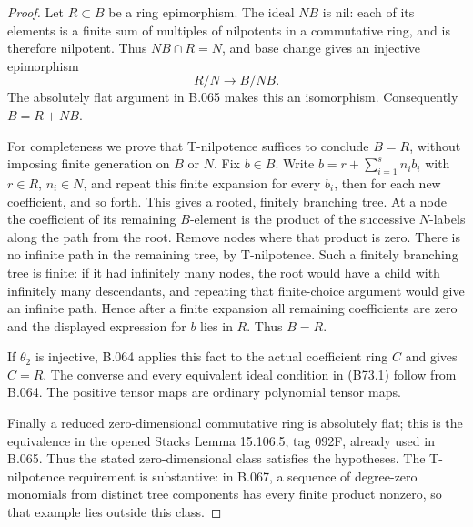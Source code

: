 \begin{proof}
Let $R\subset B$ be a ring epimorphism. The ideal $NB$ is nil: each of
its elements is a finite sum of multiples of nilpotents in a commutative
ring, and is therefore nilpotent. Thus $NB\cap R=N$, and base change
gives an injective epimorphism
\[
                         R/N\longrightarrow B/NB.
\]
The absolutely flat argument in B.065 makes this an isomorphism.
Consequently $B=R+NB$.

For completeness we prove that T-nilpotence suffices to conclude
$B=R$, without imposing finite generation on $B$ or $N$. Fix $b\in B$.
Write $b=r+\sum_{i=1}^s n_i b_i$ with $r\in R$, $n_i\in N$, and repeat
this finite expansion for every $b_i$, then for each new coefficient,
and so forth. This gives a rooted, finitely branching tree. At a node
the coefficient of its remaining $B$-element is the product of the
successive $N$-labels along the path from the root. Remove nodes where
that product is zero. There is no infinite path in the remaining tree,
by T-nilpotence. Such a finitely branching tree is finite: if it had
infinitely many nodes, the root would have a child with infinitely many
descendants, and repeating that finite-choice argument would give an
infinite path. Hence after a finite expansion all remaining coefficients
are zero and the displayed expression for $b$ lies in $R$. Thus $B=R$.

If $\theta_2$ is injective, B.064 applies this fact to the actual
coefficient ring $C$ and gives $C=R$. The converse and every equivalent
ideal condition in (B73.1) follow from B.064. The positive tensor maps
are ordinary polynomial tensor maps.

Finally a reduced zero-dimensional commutative ring is absolutely flat;
this is the equivalence in the opened Stacks Lemma 15.106.5, tag 092F,
already used in B.065. Thus the stated zero-dimensional class satisfies
the hypotheses. The T-nilpotence requirement is substantive: in B.067,
a sequence of degree-zero monomials from distinct tree components has
every finite product nonzero, so that example lies outside this class.
\end{proof}
